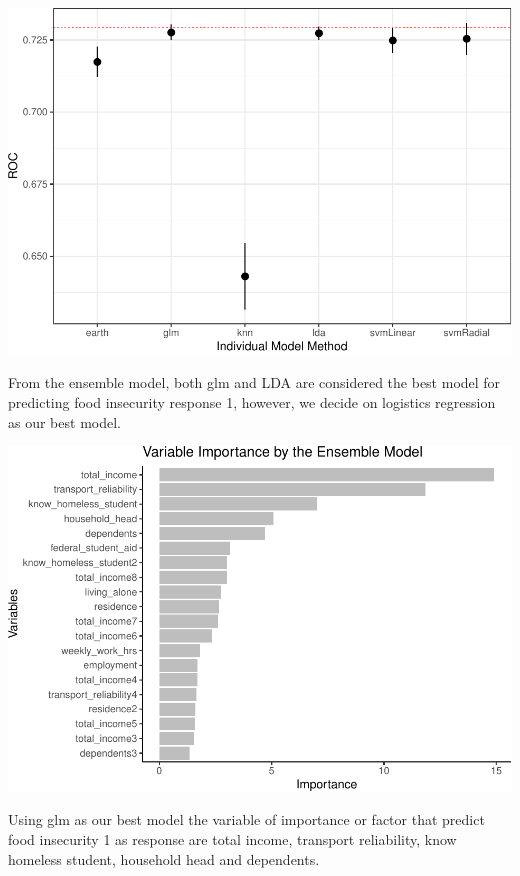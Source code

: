 \documentclass[
  10pt,
]{article}
\begin{document}
\begin{center}\includegraphics{phase2_report_files/figure-latex/unnamed-chunk-18-1} \end{center}

From the ensemble model, both glm and LDA are considered the best model for predicting food insecurity response 1, however, we decide on logistics regression as our best model.\\

\begin{center}\includegraphics{phase2_report_files/figure-latex/unnamed-chunk-19-1} \end{center}

Using glm as our best model the variable of importance or factor that predict food insecurity 1 as response are total income, transport reliability, know homeless student, household head and dependents.\\
\end{document}
